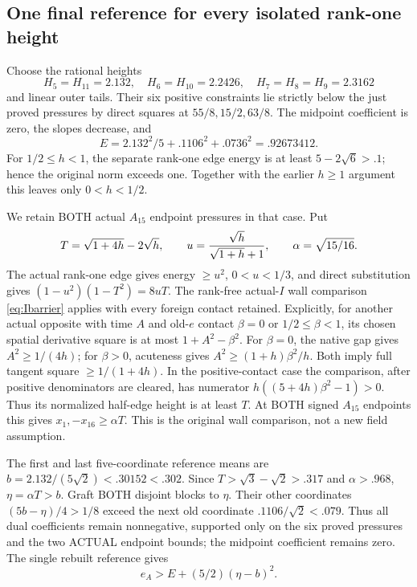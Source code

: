 \documentclass[11pt]{article}
\begin{document}
\subsection{One final reference for every isolated rank-one height}
\label{app:arithA15isolatedcomposition}

Choose the rational heights
\[
 H_5=H_{11}=2.132,\quad H_6=H_{10}=2.2426,\quad
 H_7=H_8=H_9=2.3162
\]
and linear outer tails.
Their six positive constraints lie strictly below the just
proved pressures by direct squares at \(55/8,15/2,63/8\).
The midpoint coefficient is zero, the slopes decrease, and
\[
                 E=2.132^2/5+.1106^2+.0736^2=.92673412 .
\]
For \(1/2\le h<1\), the separate rank-one edge energy is
at least \(5-2\sqrt6>.1\); hence the original norm exceeds one.
Together with the earlier \(h\ge1\) argument this leaves
only \(0<h<1/2\).

We retain BOTH actual \(A_{15}\) endpoint pressures in that case.
Put
\[
 T=\sqrt{1+4h}-2\sqrt h,\qquad
 u={\sqrt h\over\sqrt{1+h}+1},\qquad
 \alpha=\sqrt{15/16}.
\]
The actual rank-one edge gives energy \(\ge u^2\), \(0<u<1/3\),
and direct substitution gives
\((1-u^2)(1-T^2)=8uT\).
The rank-free actual-\(I\) wall comparison
\eqref{eq:Ibarrier} applies with every foreign contact retained.
Explicitly, for another actual opposite with time \(A\)
and old-\(e\) contact \(\beta=0\) or \(1/2\le\beta<1\),
its chosen spatial derivative square is at most
\(1+A^2-\beta^2\).
For \(\beta=0\), the native gap gives \(A^2\ge1/(4h)\);
for \(\beta>0\), acuteness gives
\(A^2\ge(1+h)\beta^2/h\).
Both imply full tangent square \(\ge1/(1+4h)\).
In the positive-contact case the comparison, after positive
denominators are cleared, has numerator
\(h((5+4h)\beta^2-1)>0\).
Thus its normalized half-edge height is at least \(T\).
At BOTH signed \(A_{15}\) endpoints this gives
\(x_1,-x_{16}\ge\alpha T\).
This is the original wall comparison, not a new field assumption.

The first and last five-coordinate reference means are
\(b=2.132/(5\sqrt2)<.30152<.302\).
Since \(T>\sqrt3-\sqrt2>.317\) and \(\alpha>.968\),
\(\eta=\alpha T>b\).
Graft BOTH disjoint blocks to \(\eta\).
Their other coordinates
\((5b-\eta)/4>1/8\) exceed the next old coordinate
\(.1106/\sqrt2<.079\).
Thus all dual coefficients remain nonnegative, supported only
on the six proved pressures and the two ACTUAL endpoint bounds;
the midpoint coefficient remains zero.
The single rebuilt reference gives
\[
                         e_A>E+(5/2)(\eta-b)^2 .
\]
\end{document}
